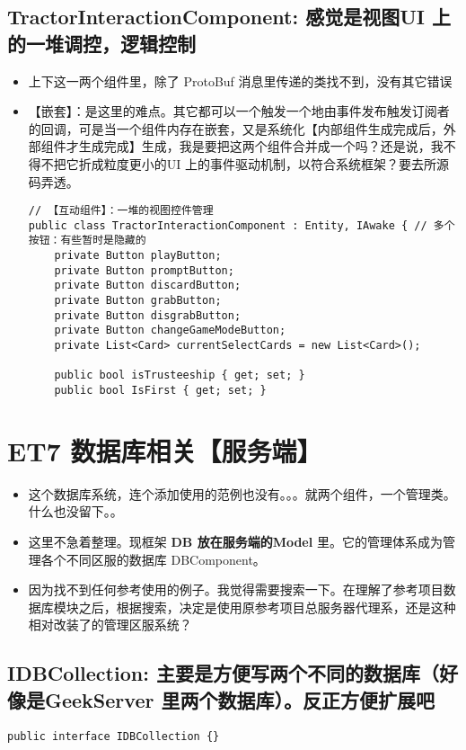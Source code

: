 \documentclass[9pt, b5paper]{article}
\begin{document}
\subsection{TractorInteractionComponent: 感觉是视图UI 上的一堆调控，逻辑控制}
\label{sec-4-8}
\begin{itemize}
\item 上下这一两个组件里，除了 ProtoBuf 消息里传递的类找不到，没有其它错误
\item 【嵌套】：是这里的难点。其它都可以一个触发一个地由事件发布触发订阅者的回调，可是当一个组件内存在嵌套，又是系统化【内部组件生成完成后，外部组件才生成完成】生成，我是要把这两个组件合并成一个吗？还是说，我不得不把它折成粒度更小的UI 上的事件驱动机制，以符合系统框架？要去所源码弄透。
\begin{verbatim}
// 【互动组件】：一堆的视图控件管理 
public class TractorInteractionComponent : Entity, IAwake { // 多个按钮：有些暂时是隐藏的
    private Button playButton;
    private Button promptButton;
    private Button discardButton;
    private Button grabButton;
    private Button disgrabButton;
    private Button changeGameModeButton;
    private List<Card> currentSelectCards = new List<Card>();

    public bool isTrusteeship { get; set; }
    public bool IsFirst { get; set; }
\end{verbatim}
\end{itemize}

\section{ET7 数据库相关【服务端】}
\label{sec-5}
\begin{itemize}
\item 这个数据库系统，连个添加使用的范例也没有。。。就两个组件，一个管理类。什么也没留下。。
\item 这里不急着整理。现框架 \textbf{DB 放在服务端的Model} 里。它的管理体系成为管理各个不同区服的数据库 DBComponent。
\item 因为找不到任何参考使用的例子。我觉得需要搜索一下。在理解了参考项目数据库模块之后，根据搜索，决定是使用原参考项目总服务器代理系，还是这种相对改装了的管理区服系统？
\end{itemize}
\subsection{IDBCollection: 主要是方便写两个不同的数据库（好像是GeekServer 里两个数据库）。反正方便扩展吧}
\label{sec-5-1}
\begin{verbatim}
public interface IDBCollection {}
\end{verbatim}
\end{document}
